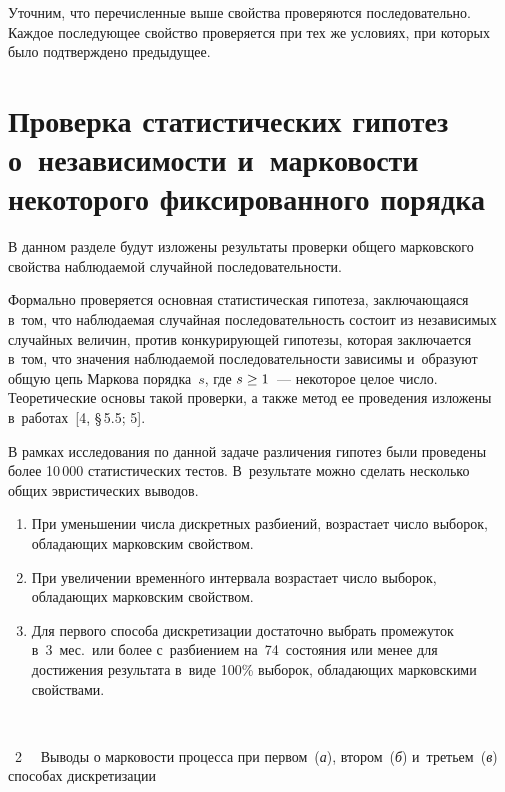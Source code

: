 \begin{multicols}{2}
  Уточним, что перечисленные выше свойства проверяются последовательно. 
Каждое последующее свойство проверяется при тех же условиях, при которых 
было подтверждено предыдущее.



\section{Проверка статистических гипотез о~независимости 
и~марковости некоторого фиксированного порядка}
  
  В данном разделе будут изложены результаты проверки общего марковского 
свойства на\-блю\-да\-емой случайной последовательности.
  
  Формально проверяется основная статистическая гипотеза, заключающаяся 
  в~том, что наблюдаемая случайная последовательность состоит из независимых 
случайных величин, против конкурирующей гипотезы, которая заключается 
в~том, что значения наблюдаемой последовательности зависимы и~образуют 
общую цепь Маркова порядка~$s$, где $s\hm\geq 1$~--- некоторое целое число. 
Теоретические основы такой проверки, а также метод ее проведения изложены в~работах~[4,  \S\,5.5; 5]. 
  
  В рамках исследования по данной задаче различения гипотез были проведены 
более 10\,000 статистических тестов. В~результате можно сделать несколько 
общих эвристических выводов.
  \begin{enumerate}[1.]
\item При уменьшении числа дискретных разбиений, возрастает число 
выборок, обладающих марковским свойством.
\item При увеличении временн$\acute{\mbox{о}}$го интервала воз\-рас\-та\-ет 
число выборок, обладающих марковским свойством.
\item Для первого способа дискретизации достаточно выбрать промежуток 
в~3~мес.\ или более с~раз\-би\-ени\-ем на~74~состояния или менее для 
достижения результата в~виде 100\% выборок, обла\-да\-ющих марковскими 
свойствами.
\end{enumerate}

{ \begin{center}  %
 \vspace*{-1pt}
   \mbox{%
\epsfxsize=70.203mm
}

\end{center}

\vspace*{-3pt}

\noindent
{{\figurename~2}\ \ \small{
Выводы о марковости процесса при первом~(\textit{а}), втором~(\textit{б}) и~третьем~(\textit{в}) способах дискретизации
}}}


\end{multicols}
